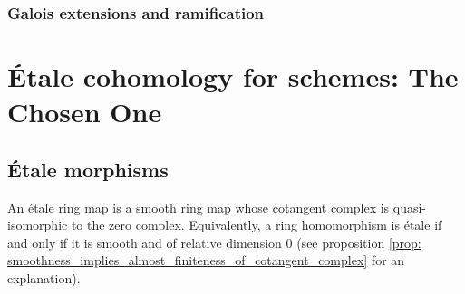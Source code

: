         
        \subsubsection{Galois extensions and ramification}

\section{\'Etale cohomology for schemes: The Chosen One}
    \subsection{\'Etale morphisms} %
        \begin{definition} \label{def: etale_morphisms} 
            An \'etale ring map is a smooth ring map whose cotangent complex is quasi-isomorphic to the zero complex. Equivalently, a ring homomorphism is \'etale if and only if it is smooth and of relative dimension $0$ (see proposition \ref{prop: smoothness_implies_almost_finiteness_of_cotangent_complex} for an explanation). 
        \end{definition}
        
